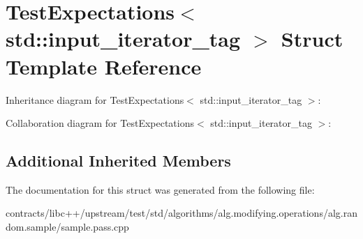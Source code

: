 \hypertarget{struct_test_expectations_3_01std_1_1input__iterator__tag_01_4}{}\section{Test\+Expectations$<$ std\+:\+:input\+\_\+iterator\+\_\+tag $>$ Struct Template Reference}
\label{struct_test_expectations_3_01std_1_1input__iterator__tag_01_4}


Inheritance diagram for Test\+Expectations$<$ std\+:\+:input\+\_\+iterator\+\_\+tag $>$\+:


Collaboration diagram for Test\+Expectations$<$ std\+:\+:input\+\_\+iterator\+\_\+tag $>$\+:
\subsection*{Additional Inherited Members}


The documentation for this struct was generated from the following file\+:\begin{DoxyCompactItemize}
\item 
contracts/libc++/upstream/test/std/algorithms/alg.\+modifying.\+operations/alg.\+random.\+sample/sample.\+pass.\+cpp\end{DoxyCompactItemize}
